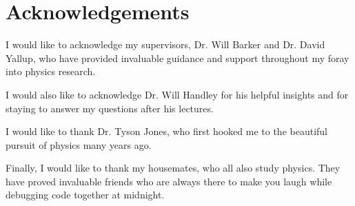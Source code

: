 \documentclass[11pt]{article}
\begin{document}
\section*{Acknowledgements}
    I would like to acknowledge my supervisors, Dr. Will Barker and Dr. David Yallup, who have provided invaluable
    guidance and support throughout my foray into physics research.

    I would also like to acknowledge Dr. Will Handley for his helpful insights
    and for staying to answer my questions after his lectures.

    I would like to thank Dr. Tyson Jones, who first hooked me to the beautiful pursuit of physics many years ago.

    Finally, I would like to thank my housemates, who all also study physics.
    They have proved invaluable friends who are always there to make you laugh while debugging code together at midnight.
\end{document}
